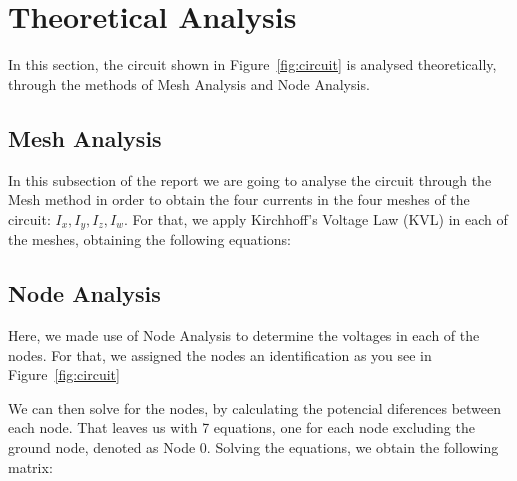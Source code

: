 \section{Theoretical Analysis}
\label{sec:analysis}

In this section, the circuit shown in Figure~\ref{fig:circuit} is analysed
theoretically, through the methods of Mesh Analysis and Node Analysis.

\subsection{Mesh Analysis}
In this subsection of the report we are going to analyse the circuit through the Mesh method in order to obtain the four currents in the four meshes of the circuit: $I_x, I_y, I_z, I_w$.
For that, we apply Kirchhoff's Voltage Law (KVL) in each of the meshes, obtaining the following equations: 

\subsection{Node Analysis}

Here, we made use of Node Analysis to determine the voltages in each
of the nodes. For that, we assigned the nodes an identification as you see
in Figure~\ref{fig:circuit}\par
We can then solve for the nodes, by calculating the potencial diferences between each node. That leaves us with 7 equations, one for each node excluding the ground node, denoted as Node 0.
Solving the equations, we obtain the following matrix:

